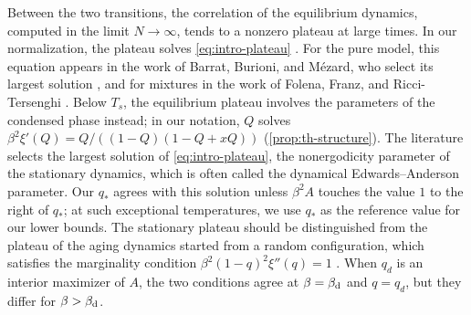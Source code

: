 Between the two transitions, the correlation of the equilibrium dynamics, computed in the limit $N\to\infty$, tends to a nonzero plateau at large times. In our normalization, the plateau solves \eqref{eq:intro-plateau} \cite{CrisantiHornerSommers1993}. For the pure model, this equation appears in the work of Barrat, Burioni, and M\'ezard, who select its largest solution \cite[Equation~(14)]{BarratBurioniMezard1996}, and for mixtures in the work of Folena, Franz, and Ricci-Tersenghi \cite[Equation~(A2)]{FolenaFranzRicciTersenghi2020}.
Below $T_s$, the equilibrium plateau involves the parameters of the condensed phase instead; in our notation, $Q$ solves $\beta^2\xi'(Q)=Q/((1-Q)(1-Q+xQ))$ (\cref{prop:th-structure}). The literature selects the largest solution of \eqref{eq:intro-plateau}, the nonergodicity parameter of the stationary dynamics, which is often called the dynamical Edwards--Anderson parameter. Our $q_*$ agrees with this solution unless $\beta^2A$ touches the value $1$ to the right of $q_*$; at such exceptional temperatures, we use $q_*$ as the reference value for our lower bounds. The stationary plateau should be distinguished from the plateau of the aging dynamics started from a random configuration, which satisfies the marginality condition $\beta^2(1-q)^2\xi''(q)=1$ \cite[Equation~(8)]{FranzParisi1995}. When $q_d$ is an interior maximizer of $A$, the two conditions agree at $\beta=\beta_{\mathrm d}$ and $q=q_d$, but they differ for $\beta>\beta_{\mathrm d}$.

